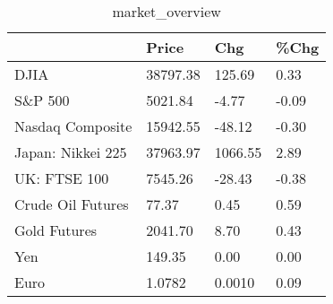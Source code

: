 \documentclass{article}%
\begin{document}
%


\begin{table}[htbp]%
\caption{market\_overview}%
\centering%
\begin{adjustbox}{width=1\textwidth}%
\begin{tabular}{llll}
\toprule
                  &    Price &     Chg &  \%Chg \\
\midrule
             DJIA & 38797.38 &  125.69 &  0.33 \\
          S\&P 500 &  5021.84 &   -4.77 & -0.09 \\
 Nasdaq Composite & 15942.55 &  -48.12 & -0.30 \\
Japan: Nikkei 225 & 37963.97 & 1066.55 &  2.89 \\
     UK: FTSE 100 &  7545.26 &  -28.43 & -0.38 \\
Crude Oil Futures &    77.37 &    0.45 &  0.59 \\
     Gold Futures &  2041.70 &    8.70 &  0.43 \\
              Yen &   149.35 &    0.00 &  0.00 \\
             Euro &   1.0782 &  0.0010 &  0.09 \\
\bottomrule
\end{tabular}
%
\end{adjustbox}%
\end{table}

%
\end{document}
